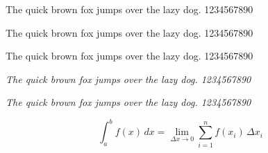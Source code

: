 \documentclass{article}
\newcommand{\pangram}[1]{{#1 The quick brown fox jumps over
  the lazy dog. 1234567890\par}}
\begin{document}
\large
\pangram{\rmfamily}
\pangram{\sffamily}
\pangram{\ttfamily}
\pangram{\itshape}
\pangram{\slshape}
\[
  \int_a^b \! f(x) \, dx = \lim_{\Delta x \rightarrow 0}
  \sum_{i=1}^{n} f(x_i) \,\Delta x_i
\]
\end{document}
